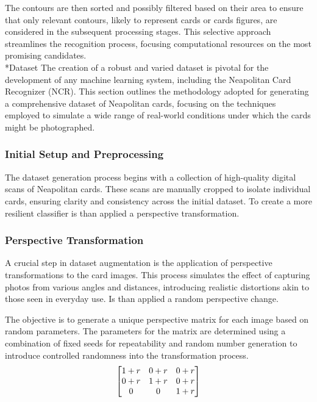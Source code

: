 \documentclass[twocolumn, a4paper,10pt]{article}
\makeatletter
\renewcommand\subsection{\@startsection{subsection}{1}{\z@}{\z@}{\z@}{\normalfont\normalsize\bfseries}}
\renewcommand\subsection{\@startsection{subsection}{1}{\z@}{\z@}{0.1pt}{\normalfont\normalsize\bfseries}}
\makeatother
\begin{document}
The contours are then sorted and possibly filtered based on their area to ensure that only relevant contours, likely to represent cards or cards figures, are considered in the subsequent processing stages. This selective approach streamlines the recognition process, focusing computational resources on the most promising candidates.
\\
\subsection*{Dataset}
The creation of a robust and varied dataset is pivotal for the development of any machine learning system, including the Neapolitan Card Recognizer (NCR). This section outlines the methodology adopted for generating a comprehensive dataset of Neapolitan cards, focusing on the techniques employed to simulate a wide range of real-world conditions under which the cards might be photographed.

\subsubsection{Initial Setup and Preprocessing}
The dataset generation process begins with a collection of high-quality digital scans of Neapolitan cards. These scans are manually cropped to isolate individual cards, ensuring clarity and consistency across the initial dataset. To create a more resilient classifier is than applied a perspective transformation. 

\subsubsection{Perspective Transformation}
A crucial step in dataset augmentation is the application of perspective transformations to the card images. This process simulates the effect of capturing photos from various angles and distances, introducing realistic distortions akin to those seen in everyday use. Is than applied a random perspective change.

The objective is to generate a unique perspective matrix for each image based on random parameters. The parameters for the matrix are determined using a combination of fixed seeds for repeatability and random number generation to introduce controlled randomness into the transformation process.
\begin{equation}
  \centering
  \begin{bmatrix}
    1+r & 0+r & 0+r\\
    0+r & 1+r & 0+r\\
    0 & 0 & 1+r
  \end{bmatrix}
\end{equation}
\end{document}
